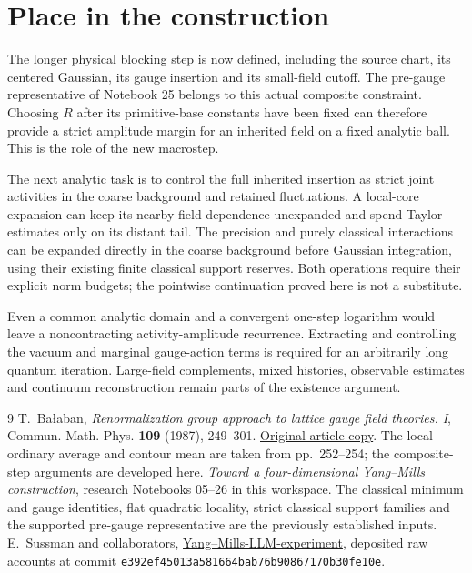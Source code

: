 \section{Place in the construction}

The longer physical blocking step is now defined, including the
source chart, its centered Gaussian, its gauge insertion and its
small-field cutoff. The pre-gauge representative of Notebook 25
belongs to this actual composite constraint. Choosing $R$ after its
primitive-base constants have been fixed can therefore provide a
strict amplitude margin for an inherited field on a fixed analytic
ball. This is the role of the new macrostep.

The next analytic task is to control the full inherited insertion
as strict joint activities in the coarse background and retained
fluctuations. A local-core expansion can keep its nearby field
dependence unexpanded and spend Taylor estimates only on its distant
tail. The precision and purely classical interactions can be
expanded directly in the coarse background before Gaussian
integration, using their existing finite classical support reserves.
Both operations require their explicit norm budgets; the pointwise
continuation proved here is not a substitute.

Even a common analytic domain and a convergent one-step logarithm
would leave a noncontracting activity-amplitude recurrence.
Extracting and controlling the vacuum and marginal gauge-action
terms is required for an arbitrarily long quantum iteration.
Large-field complements, mixed histories, observable estimates and
continuum reconstruction remain parts of the existence argument.

\begin{thebibliography}{9}
T.~Ba\l aban,
\emph{Renormalization group approach to lattice gauge field
theories. I},
Commun. Math. Phys. \textbf{109} (1987), 249--301.
\href{https://scispace.com/pdf/renormalization-group-approach-to-lattice-gauge-field-3ygai0vxt1.pdf}{Original article copy}.
The local ordinary average and contour mean are taken from
pp.~252--254; the composite-step arguments are developed here.
\emph{Toward a four-dimensional Yang--Mills construction},
research Notebooks 05--26 in this workspace.
The classical minimum and gauge identities, flat quadratic
locality, strict classical support families and the supported
pre-gauge representative are the previously established inputs.
E.~Sussman and collaborators,
\href{https://github.com/ethanwsussman/Yang--Mills-LLM-experiment}{Yang--Mills-LLM-experiment},
deposited raw accounts at commit
\texttt{e392ef45013a581664bab76b90867170b30fe10e}.
\end{thebibliography}

